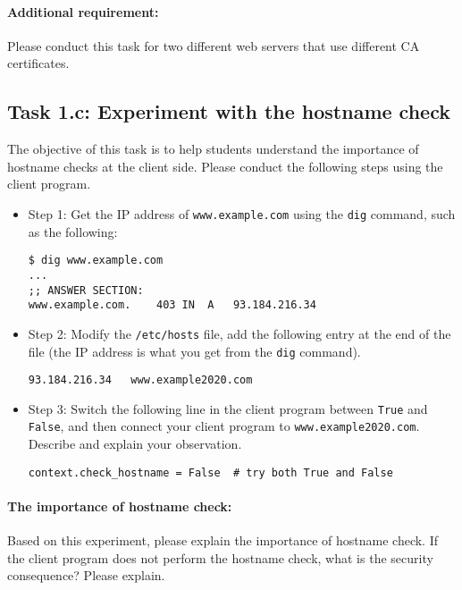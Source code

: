 \paragraph{Additional requirement:} Please conduct this task for two different web servers
that use different CA certificates.


\subsection{Task 1.c: Experiment with the hostname check}

The objective of this task is to help students understand the importance of 
hostname checks at the client side. Please conduct the following 
steps using the client program. 


\begin{itemize}
\item Step 1: Get the IP address of \texttt{www.example.com} using 
the \texttt{dig} command, such as the following: 


\begin{lstlisting}
$ dig www.example.com
...
;; ANSWER SECTION:
www.example.com.	403	IN	A	93.184.216.34
\end{lstlisting}

\item Step 2: Modify the \texttt{/etc/hosts} file, add the following 
entry at the end of the file (the IP address is what you get from
the \texttt{dig} command). 

\begin{lstlisting}
93.184.216.34   www.example2020.com
\end{lstlisting}


\item Step 3: Switch the following line in the client program
between \texttt{True} and \texttt{False}, and then 
connect your client program to \texttt{www.example2020.com}. 
Describe and explain your observation. 

\begin{lstlisting}
context.check_hostname = False  # try both True and False
\end{lstlisting}
\end{itemize}


\paragraph{The importance of hostname check:}
Based on this experiment, please explain the importance of hostname check.
If the client program does not perform the hostname check, what 
is the security consequence? Please explain.


